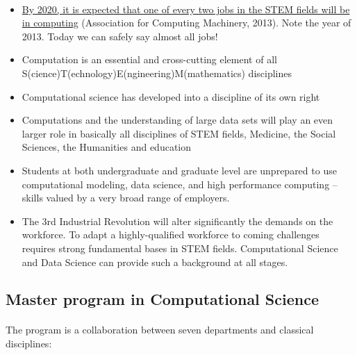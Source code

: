 \documentclass[%
oneside,                 %
final,                   %
10pt]{article}
\begin{document}
\paragraph{}
\begin{itemize}
\item \href{{http://pathways.acm.org/executive-summary.html}}{By 2020, it is expected that one of every two jobs in the STEM fields will be in computing} (Association for Computing Machinery, 2013). Note the year of 2013. Today we can safely say almost all jobs!

\item Computation is an essential and cross-cutting element of all S(cience)T(echnology)E(ngineering)M(mathematics) disciplines

\item Computational science has developed into a discipline of its own right

\item Computations and the understanding of large data sets will play an even larger role in basically all disciplines of STEM fields, Medicine, the Social Sciences, the Humanities and  education

\item Students at both undergraduate and graduate level are unprepared to use computational modeling, data science, and high performance computing – skills valued by a very broad range of employers.

\item The 3rd Industrial Revolution will alter significantly the demands on the workforce. To adapt a highly-qualified workforce to coming challenges  requires strong fundamental bases in STEM fields. Computational Science and Data Science can provide such a background at all stages.
\end{itemize}

\noindent



\subsection{Master program in Computational Science}

\paragraph{}

The program is a collaboration between seven departments and classical disciplines:
\end{document}
